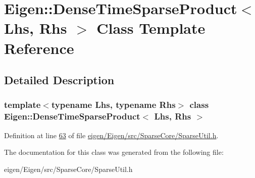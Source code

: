 \hypertarget{class_eigen_1_1_dense_time_sparse_product}{}\section{Eigen\+:\+:Dense\+Time\+Sparse\+Product$<$ Lhs, Rhs $>$ Class Template Reference}
\label{class_eigen_1_1_dense_time_sparse_product}


\subsection{Detailed Description}
\subsubsection*{template$<$typename Lhs, typename Rhs$>$\newline
class Eigen\+::\+Dense\+Time\+Sparse\+Product$<$ Lhs, Rhs $>$}



Definition at line \hyperlink{eigen_2_eigen_2src_2_sparse_core_2_sparse_util_8h_source_l00063}{63} of file \hyperlink{eigen_2_eigen_2src_2_sparse_core_2_sparse_util_8h_source}{eigen/\+Eigen/src/\+Sparse\+Core/\+Sparse\+Util.\+h}.



The documentation for this class was generated from the following file\+:\begin{DoxyCompactItemize}
\item 
eigen/\+Eigen/src/\+Sparse\+Core/\+Sparse\+Util.\+h\end{DoxyCompactItemize}
